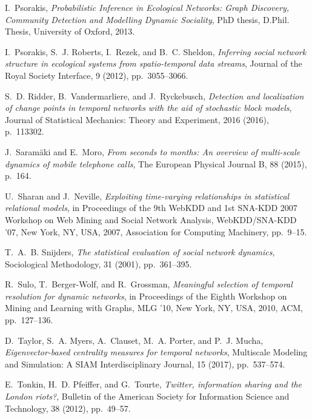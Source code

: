 \documentclass[journal,transmag]{IEEEtran}
\begin{document}
\begin{thebibliography}{10}
{\sc I.~Psorakis}, {\em Probabilistic Inference in Ecological Networks: {G}raph
  Discovery, Community Detection and Modelling Dynamic Sociality}, PhD thesis,
  D.Phil. Thesis, University of Oxford, 2013.

{\sc I.~Psorakis, S.~J. Roberts, I.~Rezek, and B.~C. Sheldon}, {\em Inferring
  social network structure in ecological systems from spatio-temporal data
  streams}, Journal of the Royal Society Interface, 9 (2012), pp.~3055--3066.

{\sc S.~D. Ridder, B.~Vandermarliere, and J.~Ryckebusch}, {\em Detection and
  localization of change points in temporal networks with the aid of stochastic
  block models}, Journal of Statistical Mechanics: Theory and Experiment, 2016
  (2016), p.~113302.

{\sc J.~Saram\"{a}ki and E.~Moro}, {\em From seconds to months: {A}n overview
  of multi-scale dynamics of mobile telephone calls}, The European Physical
  Journal B, 88 (2015), p.~164.

{\sc U.~Sharan and J.~Neville}, {\em Exploiting time-varying relationships in
  statistical relational models}, in Proceedings of the 9th WebKDD and 1st
  SNA-KDD 2007 Workshop on Web Mining and Social Network Analysis,
  WebKDD/SNA-KDD '07, New York, NY, USA, 2007, Association for Computing
  Machinery, pp.~9--15.

{\sc T.~A.~B. Snijders}, {\em The statistical evaluation of social network
  dynamics}, Sociological Methodology, 31 (2001), pp.~361--395.

{\sc R.~Sulo, T.~Berger-Wolf, and R.~Grossman}, {\em Meaningful selection of
  temporal resolution for dynamic networks}, in Proceedings of the Eighth
  Workshop on Mining and Learning with Graphs, MLG '10, New York, NY, USA,
  2010, ACM, pp.~127--136.

{\sc D.~Taylor, S.~A. Myers, A.~Clauset, M.~A. Porter, and P.~J. Mucha}, {\em
  Eigenvector-based centrality measures for temporal networks}, Multiscale
  Modeling and Simulation: A SIAM Interdisciplinary Journal, 15 (2017),
  pp.~537--574.

{\sc E.~Tonkin, H.~D. Pfeiffer, and G.~Tourte}, {\em {Twitter, information
  sharing and the London riots?}}, Bulletin of the American Society for
  Information Science and Technology, 38 (2012), pp.~49--57.


\end{thebibliography}
\end{document}
